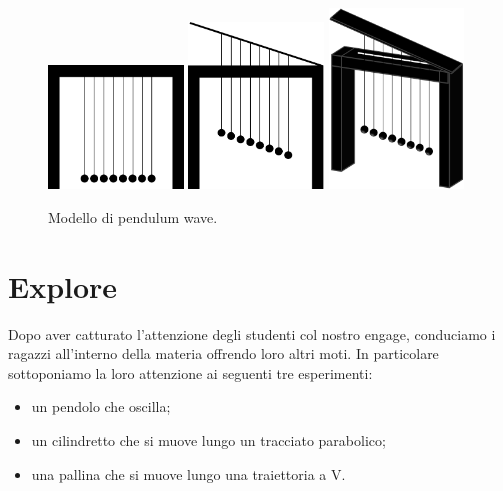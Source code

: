 \documentclass{article}
\begin{document}
\begin{figure}
\centering
  \includegraphics[width=0.32\textwidth]{pendulum_wave3}
  \includegraphics[width=0.32\textwidth]{pendulum_wave2}
  \includegraphics[width=0.32\textwidth]{pendulum_wave1}
  \caption{Modello di pendulum wave.}
  \label{fig:pendulum_wave}
\end{figure}

\section{Explore}
Dopo aver catturato l'attenzione degli studenti col nostro engage, conduciamo i ragazzi all'interno della
materia offrendo loro altri moti.
In particolare sottoponiamo la loro attenzione ai seguenti tre esperimenti:

\begin{itemize}
\item un pendolo che
oscilla;
\item un cilindretto che si muove lungo un tracciato parabolico;
\item una pallina che si muove lungo una traiettoria a V.
\end{itemize}
\end{document}
